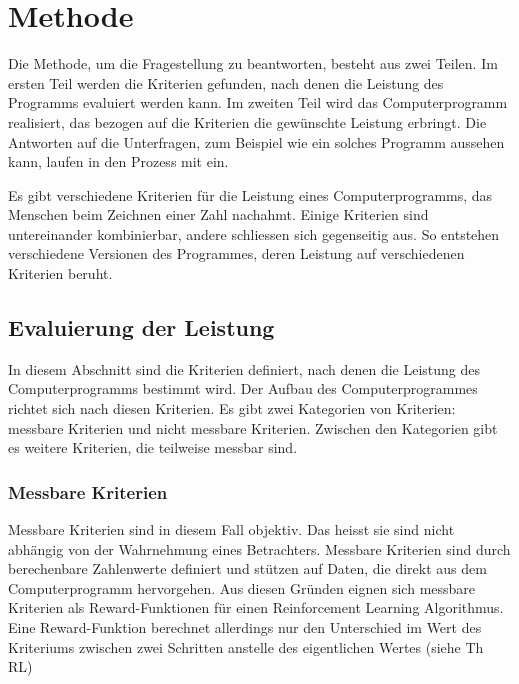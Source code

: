 \chapter{Methode}
Die Methode, um die Fragestellung zu beantworten, besteht aus zwei Teilen. Im
ersten Teil werden die Kriterien gefunden, nach denen die Leistung des Programms
evaluiert werden kann. Im zweiten Teil wird das Computerprogramm realisiert, das
bezogen auf die Kriterien die gewünschte Leistung erbringt. Die Antworten auf
die Unterfragen, zum Beispiel wie ein solches Programm aussehen kann, laufen in
den Prozess mit ein. 

Es gibt verschiedene Kriterien für die Leistung eines Computerprogramms, das
Menschen beim Zeichnen einer Zahl nachahmt. Einige Kriterien sind untereinander  %
kombinierbar, andere schliessen sich gegenseitig aus. So entstehen verschiedene
Versionen des Programmes, deren Leistung auf verschiedenen Kriterien beruht.


\section{Evaluierung der Leistung}
In diesem Abschnitt sind die Kriterien definiert, nach denen die Leistung des
Computerprogramms bestimmt wird. Der Aufbau des Computerprogrammes richtet sich
nach diesen Kriterien. Es gibt zwei Kategorien von Kriterien: messbare Kriterien
und nicht messbare Kriterien. Zwischen den Kategorien gibt es weitere Kriterien,
die teilweise messbar sind.

\subsection*{Messbare Kriterien}
\label{chap:m_messbare}
Messbare Kriterien sind in diesem Fall objektiv. Das heisst sie sind nicht
abhängig von der Wahrnehmung eines Betrachters. Messbare Kriterien sind durch
berechenbare Zahlenwerte definiert und stützen auf Daten, die direkt aus dem
Computerprogramm hervorgehen. Aus diesen Gründen eignen sich messbare Kriterien
als Reward-Funktionen für einen Reinforcement Learning Algorithmus. Eine
Reward-Funktion berechnet allerdings nur den Unterschied im Wert des Kriteriums
zwischen zwei Schritten anstelle des eigentlichen Wertes (siehe Th RL)  %

